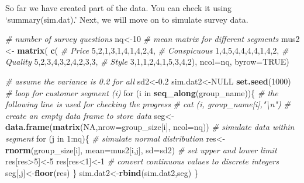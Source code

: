 \documentclass[]{book}
\newenvironment{Shaded}{\begin{snugshade}}{\end{snugshade}}
\newcommand{\KeywordTok}[1]{\textcolor[rgb]{0.13,0.29,0.53}{\textbf{{#1}}}}
\newcommand{\DataTypeTok}[1]{\textcolor[rgb]{0.13,0.29,0.53}{{#1}}}
\newcommand{\DecValTok}[1]{\textcolor[rgb]{0.00,0.00,0.81}{{#1}}}
\newcommand{\FloatTok}[1]{\textcolor[rgb]{0.00,0.00,0.81}{{#1}}}
\newcommand{\StringTok}[1]{\textcolor[rgb]{0.31,0.60,0.02}{{#1}}}
\newcommand{\CommentTok}[1]{\textcolor[rgb]{0.56,0.35,0.01}{\textit{{#1}}}}
\newcommand{\OtherTok}[1]{\textcolor[rgb]{0.56,0.35,0.01}{{#1}}}
\newcommand{\NormalTok}[1]{{#1}}
\theoremstyle{definition}
\theoremstyle{definition}
\theoremstyle{remark}
\begin{document}
So far we have created part of the data. You can check it using
`summary(sim.dat).' Next, we will move on to simulate survey data.

\begin{Shaded}
\begin{Highlighting}[]
\CommentTok{# number of survey questions}
\NormalTok{nq<-}\DecValTok{10}
\CommentTok{# mean matrix for different segments }
\NormalTok{mus2 <-}\StringTok{ }\KeywordTok{matrix}\NormalTok{( }\KeywordTok{c}\NormalTok{(}
  \CommentTok{# Price}
 \DecValTok{5}\NormalTok{,}\DecValTok{2}\NormalTok{,}\DecValTok{1}\NormalTok{,}\DecValTok{3}\NormalTok{,}\DecValTok{1}\NormalTok{,}\DecValTok{4}\NormalTok{,}\DecValTok{1}\NormalTok{,}\DecValTok{4}\NormalTok{,}\DecValTok{2}\NormalTok{,}\DecValTok{4}\NormalTok{,}
  \CommentTok{# Conspicuous}
 \DecValTok{1}\NormalTok{,}\DecValTok{4}\NormalTok{,}\DecValTok{5}\NormalTok{,}\DecValTok{4}\NormalTok{,}\DecValTok{4}\NormalTok{,}\DecValTok{4}\NormalTok{,}\DecValTok{4}\NormalTok{,}\DecValTok{1}\NormalTok{,}\DecValTok{4}\NormalTok{,}\DecValTok{2}\NormalTok{,}
  \CommentTok{# Quality}
 \DecValTok{5}\NormalTok{,}\DecValTok{2}\NormalTok{,}\DecValTok{3}\NormalTok{,}\DecValTok{4}\NormalTok{,}\DecValTok{3}\NormalTok{,}\DecValTok{2}\NormalTok{,}\DecValTok{4}\NormalTok{,}\DecValTok{2}\NormalTok{,}\DecValTok{3}\NormalTok{,}\DecValTok{3}\NormalTok{,}
  \CommentTok{# Style}
 \DecValTok{3}\NormalTok{,}\DecValTok{1}\NormalTok{,}\DecValTok{1}\NormalTok{,}\DecValTok{2}\NormalTok{,}\DecValTok{4}\NormalTok{,}\DecValTok{1}\NormalTok{,}\DecValTok{5}\NormalTok{,}\DecValTok{3}\NormalTok{,}\DecValTok{4}\NormalTok{,}\DecValTok{2}\NormalTok{), }\DataTypeTok{ncol=}\NormalTok{nq, }\DataTypeTok{byrow=}\OtherTok{TRUE}\NormalTok{)}

\CommentTok{# assume the variance is 0.2 for all}
\NormalTok{sd2<-}\FloatTok{0.2}
\NormalTok{sim.dat2<-}\OtherTok{NULL}
\KeywordTok{set.seed}\NormalTok{(}\DecValTok{1000}\NormalTok{)}
\CommentTok{# loop for customer segment (i)}
\NormalTok{for (i in }\KeywordTok{seq_along}\NormalTok{(group_name))\{}
  \CommentTok{# the following line is used for checking the progress}
  \CommentTok{# cat (i, group_name[i],"\textbackslash{}n")}
  \CommentTok{# create an empty data frame to store data}
  \NormalTok{seg<-}\KeywordTok{data.frame}\NormalTok{(}\KeywordTok{matrix}\NormalTok{(}\OtherTok{NA}\NormalTok{,}\DataTypeTok{nrow=}\NormalTok{group_size[i], }\DataTypeTok{ncol=}\NormalTok{nq))  }
  \CommentTok{# simulate data within segment}
  \NormalTok{for (j in }\DecValTok{1}\NormalTok{:nq)\{}
    \CommentTok{# simulate normal distribution}
    \NormalTok{res<-}\KeywordTok{rnorm}\NormalTok{(group_size[i], }\DataTypeTok{mean=}\NormalTok{mus2[i,j], }\DataTypeTok{sd=}\NormalTok{sd2)}
    \CommentTok{# set upper and lower limit}
    \NormalTok{res[res>}\DecValTok{5}\NormalTok{]<-}\DecValTok{5}
    \NormalTok{res[res<}\DecValTok{1}\NormalTok{]<-}\DecValTok{1}
    \CommentTok{# convert continuous values to discrete integers}
    \NormalTok{seg[,j]<-}\KeywordTok{floor}\NormalTok{(res)}
  \NormalTok{\}}
  \NormalTok{sim.dat2<-}\KeywordTok{rbind}\NormalTok{(sim.dat2,seg)}
\NormalTok{\}}


\end{Highlighting}
\end{Shaded}
\end{document}
